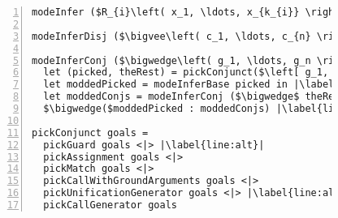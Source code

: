 


\begin{figure}[h]
  \centering
  \begin{minipage}{\columnwidth}
    \begin{lstlisting}[label={fig:modeInference},
                       caption={Mode inference pseudocode},
                       captionpos=b,
                       frame=tb,
                       escapechar=|,
                       numbers=left,
                       numberstyle={\footnotesize}]
modeInfer ($R_{i}\left( x_1, \ldots, x_{k_{i}} \right) \equiv body$) = ($R_{i}\left( x_1, \ldots, x_{k_{i}} \right) \equiv$ (modeInferDisj body)) |\label{line:body}|

modeInferDisj ($\bigvee\left( c_1, \ldots, c_{n} \right)$) = $\bigvee( $modeInferConj $ c_1, \ldots, $ modeInferConj $ c_{n})$ |\label{line:disj}|

modeInferConj ($\bigwedge\left( g_1, \ldots, g_n \right)$) =
  let (picked, theRest) = pickConjunct($\left[ g_1, \ldots, g_n \right]$) in |\label{line:pick}|
  let moddedPicked = modeInferBase picked in |\label{line:pick_analyze}|
  let moddedConjs = modeInferConj ($\bigwedge$ theRest) in |\label{line:conj}|
  $\bigwedge($moddedPicked : moddedConjs) |\label{line:result}|

pickConjunct goals =
  pickGuard goals <|> |\label{line:alt}|
  pickAssignment goals <|>
  pickMatch goals <|>
  pickCallWithGroundArguments goals <|>
  pickUnificationGenerator goals <|> |\label{line:alt2}|
  pickCallGenerator goals
    \end{lstlisting}
  \end{minipage}
\end{figure}